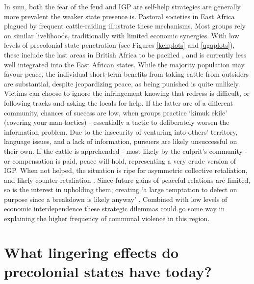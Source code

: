 In sum, both the fear of the feud and IGP are self-help strategies are generally
more prevalent the weaker state presence is. Pastoral societies in East Africa
plagued by frequent cattle-raiding illustrate these mechanisms. Most groups rely
on similar livelihoods, traditionally with limited economic synergies. With low
levels of precolonial state penetration (see Figures \ref{kenplots} and
\ref{ugaplots}), these include the last areas in British Africa to be pacified
\citep{Lamphear1992}, and is currently less well integrated into the East
African states. While the majority population may favour peace, the individual
short-term benefits from taking cattle from outsiders are substantial, despite
jeopardizing peace, as being punished is quite unlikely. Victims can choose to
ignore the infringement knowing that redress is difficult, or following tracks
and asking the locals for help. If the latter are of a different community,
chances of success are low, when groups practice `kimuk ekile' (covering your
man-tactics) - essentially a tactic to deliberately worsen the information
problem. Due to the insecurity of venturing into others’ territory, language
issues, and a lack of information, pursuers are likely unsuccessful on their
own. If the cattle is apprehended - most likely by the culprit's community - or
compensation is paid, peace will hold, representing a very crude version of IGP.
When not helped, the situation is ripe for asymmetric collective retaliation,
and likely counter-retaliation \citep[104ff]{Eaton_2008}. Since future gains of
peaceful relations are limited, so is the interest in upholding them, creating
‘a large temptation to defect on purpose since a breakdown is likely anyway’
\citep[724]{Fearon_1996}. Combined with low levels of economic interdependence
these strategic dilemmas could go some way in explaining the higher frequency of
communal violence in this region. 







 
\section{What lingering effects do precolonial states have today?}
\label{What lingering effects do precolonial states have today?}

